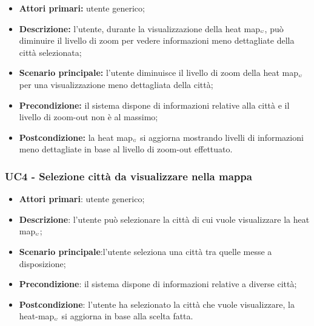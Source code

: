 \begin{itemize}
	\item \textbf{Attori primari:} utente generico;
	\item \textbf{Descrizione:} l’utente, durante la visualizzazione della heat map$_{\scaleto{G}{3pt}}$, può diminuire il livello di zoom per vedere informazioni meno dettagliate della città selezionata;
	\item \textbf{Scenario principale:} l’utente diminuisce il livello di zoom della heat map$_{\scaleto{G}{3pt}}$ per una visualizzazione meno dettagliata della città;
	\item \textbf{Precondizione:}  il sistema dispone di informazioni relative alla città e il livello di zoom-out non è al massimo;
	\item \textbf{Postcondizione:} la heat map$_{\scaleto{G}{3pt}}$ si aggiorna mostrando livelli di informazioni meno dettagliate in base al livello di zoom-out effettuato.
\end{itemize}

\subsubsection{UC4 - Selezione città da visualizzare nella mappa}\label{CasiDUsoCasiDUsoTraUnUtenteEIlFrontEndElencoCasiDUsoUC4SelezioneCittaDaVisualizzareNellaMappa}

\begin{itemize}
	\item \textbf{Attori primari}: utente generico;
	\item \textbf{Descrizione}:  l’utente può selezionare la città di cui vuole visualizzare la heat map$_{\scaleto{G}{3pt}}$;
	\item \textbf{Scenario principale}:l’utente seleziona una città tra quelle messe a disposizione;
	\item \textbf{Precondizione}: il sistema dispone di informazioni relative a diverse città;
	\item \textbf{Postcondizione}:   l’utente ha selezionato la città che vuole visualizzare, la heat-map$_{\scaleto{G}{3pt}}$ si aggiorna in base alla scelta fatta.
\end{itemize}

